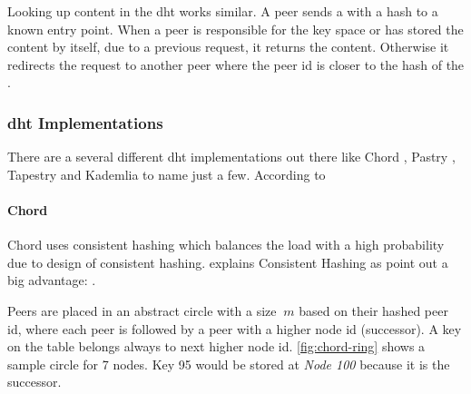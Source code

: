 Looking up content in the \gls{dht} works similar. A peer sends a  with a hash to a known entry point. When a peer is responsible for the key space or has stored the content by itself, due to a previous request, it returns the content. Otherwise it redirects the request to another peer where the peer id is closer to the hash of the .

\subsubsection{\gls{dht} Implementations}
There are a several different \gls{dht} implementations out there like Chord \cite{chord}, Pastry \cite{pastry}, Tapestry \cite{tapestry} and Kademlia \cite{kademlia} to name just a few.
According to \citet[\S7.5]{tanenbaum_wetherall_2011} 

\paragraph{Chord}
Chord uses consistent hashing which balances the load with a high probability due to design of consistent hashing. \citet{consistentHashing} explains Consistent Hashing as  \citet[\S4.2]{chord} point out a big advantage: .

Peers are placed in an abstract circle with a size $\ m $ based on their hashed peer id, where each peer is followed by a peer with a higher node id (successor). A key on the table belongs always to next higher node id. \vref{fig:chord-ring} shows a sample circle for 7 nodes. Key 95 would be stored at \textit{Node 100} because it is the successor.

